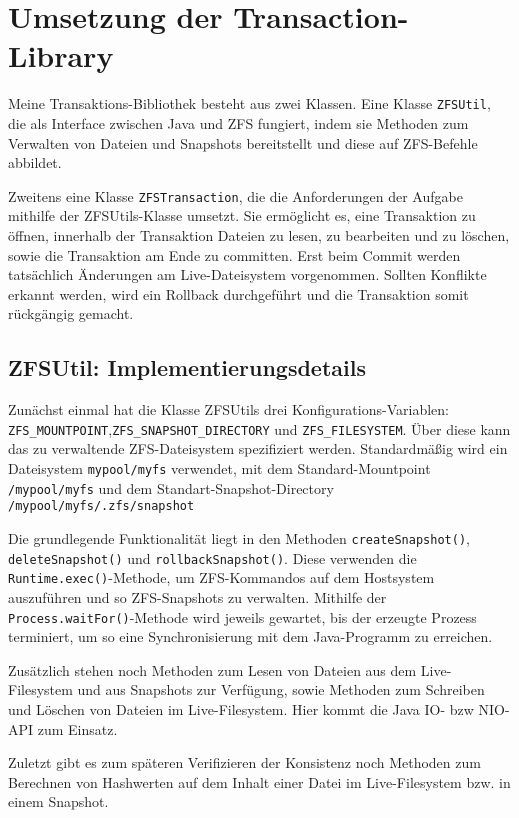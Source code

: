 \documentclass[12pt]{article}
\begin{document}
\section*{Umsetzung der Transaction-Library}
Meine Transaktions-Bibliothek besteht aus zwei Klassen. 
Eine Klasse \texttt{ZFSUtil}, die als Interface zwischen Java und ZFS fungiert, indem sie Methoden zum Verwalten von Dateien und Snapshots bereitstellt und diese auf ZFS-Befehle abbildet.

Zweitens eine Klasse \texttt{ZFSTransaction}, die die Anforderungen der Aufgabe mithilfe der ZFSUtils-Klasse umsetzt.
Sie ermöglicht es, eine Transaktion zu öffnen, innerhalb der Transaktion Dateien zu lesen, zu bearbeiten und zu löschen, sowie die Transaktion am Ende zu committen.
Erst beim Commit werden tatsächlich Änderungen am Live-Dateisystem vorgenommen. 
Sollten Konflikte erkannt werden, wird ein Rollback durchgeführt und die Transaktion somit rückgängig gemacht.

\subsection*{ZFSUtil: Implementierungsdetails}
Zunächst einmal hat die Klasse ZFSUtils drei Konfigurations-Variablen: \texttt{ZFS\_MOUNTPOINT},\linebreak \texttt{ZFS\_SNAPSHOT\_DIRECTORY} und \texttt{ZFS\_FILESYSTEM}.
Über diese kann das zu verwaltende ZFS-Dateisystem spezifiziert werden.
Standardmäßig wird ein Dateisystem \texttt{mypool/myfs} verwendet, mit dem Standard-Mountpoint \texttt{/mypool/myfs} und dem Standart-Snapshot-Directory \linebreak \texttt{/mypool/myfs/.zfs/snapshot}

Die grundlegende Funktionalität liegt in den Methoden \texttt{createSnapshot()}, \texttt{deleteSnapshot()} und \texttt{rollbackSnapshot()}.
Diese verwenden die \texttt{Runtime.exec()}-Methode, um ZFS-Kommandos auf dem Hostsystem auszuführen und so ZFS-Snapshots zu verwalten.
Mithilfe der \texttt{Process.waitFor()}-Methode wird jeweils gewartet, bis der erzeugte Prozess terminiert, um so eine Synchronisierung mit dem Java-Programm zu erreichen.

Zusätzlich stehen noch Methoden zum Lesen von Dateien aus dem Live-Filesystem und aus Snapshots zur Verfügung, sowie Methoden zum Schreiben und Löschen von Dateien im Live-Filesystem.
Hier kommt die Java IO- bzw NIO-API zum Einsatz.

Zuletzt gibt es zum späteren Verifizieren der Konsistenz noch Methoden zum Berechnen von Hashwerten auf dem Inhalt einer Datei im Live-Filesystem bzw. in einem Snapshot.
\end{document}
